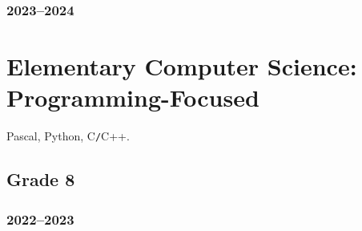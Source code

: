 \documentclass{article}
\begin{document}
\subsubsection{2023--2024}


\section{Elementary Computer Science: Programming-Focused}
Pascal, Python, C\texttt{/}C++.

\subsection{Grade 8}

\subsubsection{2022--2023}
\end{document}
